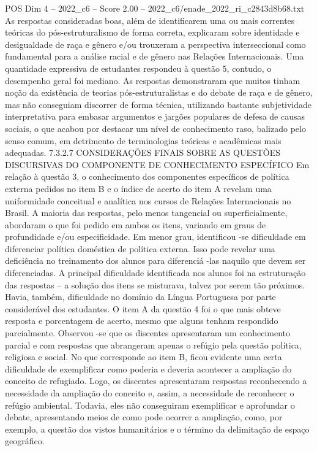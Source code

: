 \begin{textsample}{POS Dim 4 – 2022\_c6 – Score 2.00 – 2022\_c6/enade\_2022\_ri\_c2843d8b68.txt}
As respostas consideradas boas, além de identificarem uma ou mais correntes teóricas do pós-estruturalismo de forma correta, explicaram sobre identidade e desigualdade de raça e gênero e/ou trouxeram a perspectiva interseccional como fundamental para a análise racial e de gênero nas Relações Internacionais.
Uma quantidade expressiva de estudantes respondeu à questão 5, contudo, o desempenho geral foi mediano.
As respostas demonstraram que muitos tinham noção da existência de teorias pós-estruturalistas e do debate de raça e de gênero, mas não conseguiam discorrer de forma técnica, utilizando bastante subjetividade interpretativa para embasar argumentos e jargões populares de defesa de causas sociais, o que acabou por destacar um nível de conhecimento raso, balizado pelo senso comum, em detrimento de terminologias teóricas e acadêmicas mais adequadas. 7.3.2.7 CONSIDERAÇÕES FINAIS SOBRE AS QUESTÕES DISCURSIVAS DO COMPONENTE DE CONHECIMENTO ESPECÍFICO Em relação à questão 3, o conhecimento dos componentes específicos de política externa pedidos no item B e o índice de acerto do item A revelam uma uniformidade conceitual e analítica nos cursos de Relações Internacionais no Brasil.
A maioria das respostas, pelo menos tangencial ou superficialmente, abordaram o que foi pedido em ambos os itens, variando em graus de profundidade e/ou especificidade.
Em menor grau, identificou -se dificuldade em diferenciar política doméstica de política externa.
Isso pode revelar uma deficiência no treinamento dos alunos para diferenciá -las naquilo que devem ser diferenciadas.
A principal dificuldade identificada nos alunos foi na estruturação das respostas – a solução dos itens se misturava, talvez por serem tão próximos.
Havia, também, dificuldade no domínio da Língua Portuguesa por parte considerável dos estudantes.
O item A da questão 4 foi o que mais obteve resposta e porcentagem de acerto, mesmo que alguns tenham respondido parcialmente.
Observou -se que os discentes apresentaram um conhecimento parcial e com respostas que abrangeram apenas o refúgio pela questão política, religiosa e social.
No que corresponde ao item B, ficou evidente uma certa dificuldade de exemplificar como poderia e deveria acontecer a ampliação do conceito de refugiado.
Logo, os discentes apresentaram respostas reconhecendo a necessidade da ampliação do conceito e, assim, a necessidade de reconhecer o refúgio ambiental.
Todavia, eles não conseguiram exemplificar e aprofundar o debate, apresentando meios de como pode ocorrer a ampliação, como, por exemplo, a questão dos vistos humanitários e o término da delimitação de espaço geográfico.

\end{textsample}
